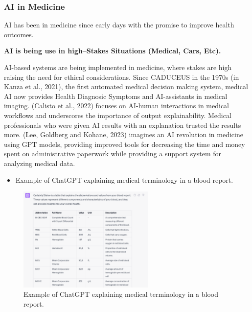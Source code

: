\documentclass[
  letterpaper,
  DIV=11,
  numbers=noendperiod]{scrartcl}
\providecommand{\tightlist}{%
  \setlength{\itemsep}{0pt}\setlength{\parskip}{0pt}}\usepackage{longtable,booktabs,array}
\begin{document}
\subsubsection{AI in Medicine}\label{ai-in-medicine}

AI has been in medicine since early days with the promise to improve
health outcomes.

\textbf{AI is being use in high--Stakes Situations (Medical, Cars,
Etc).}

AI-based systems are being implemented in medicine, where stakes are
high raising the need for ethical considerations. Since CADUCEUS in the
1970s (in Kanza et al., 2021), the first automated medical decision
making system, medical AI now provides Health Diagnosic Symptoms and
AI-assistants in medical imaging. (Calisto et al., 2022) focuses on
AI-human interactions in medical workflows and underscores the
importance of output explainability. Medical professionals who were
given AI results with an explanation trusted the results more. (Lee,
Goldberg and Kohane, 2023) imagines an AI revolution in medicine using
GPT models, providing improved tools for decreasing the time and money
spent on administrative paperwork while providing a support system for
analyzing medical data.

\begin{itemize}
\tightlist
\item
  Example of ChatGPT explaining medical terminology in a blood report.
\end{itemize}

\begin{figure}[H]

{\centering \includegraphics[width=0.6\textwidth,height=\textheight]{../images/chatgpt-medical.png}

}

\caption{Example of ChatGPT explaining medical terminology in a blood
report.}

\end{figure}%
\end{document}
